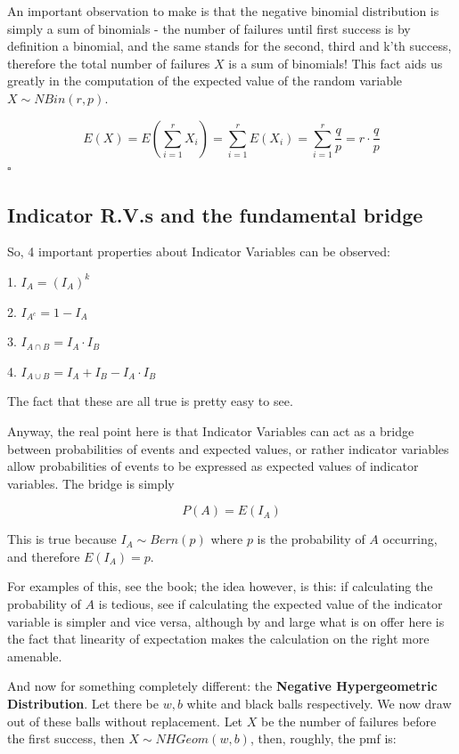 \documentclass{article}
\newcommand{\qed}{\hfill$\square$}
\begin{document}
		An important observation to make is that the negative binomial distribution is simply a sum of binomials - the number of failures until first success is by definition a binomial, and the same stands for the second, third and k'th success, therefore the total number of failures $X$ is a sum of binomials! This fact aids us greatly in the computation of the expected value of the random variable $X \sim NBin(r, p)$.
		
		$$E(X) = E\left( \sum^r_{i=1} X_i \right) = \sum^r_{i=1} E(X_i) = \sum^r_{i=1} \frac{q}{p} = r \cdot \frac{q}{p}$$\qed
		
		
	\subsection{Indicator R.V.s and the fundamental bridge}
	
		So, 4 important properties about Indicator Variables can be observed:
		
		1. $ I_A = (I_A)^k $
		
		2. $ I_{A^c} = 1 - I_A $
		
		3. $ I_{A \cap B} = I_A\cdot I_B $
		
		4. $ I_{A \cup B} = I_A + I_B - I_A\cdot I_B $
		
		The fact that these are all true is pretty easy to see.
		
		Anyway, the real point here is that Indicator Variables can act as a bridge between probabilities of events and expected values, or rather indicator variables allow probabilities of events to be expressed as expected values of indicator variables. The bridge is simply
		
		$$ P(A) = E(I_A) $$
		
		This is true because $I_A \sim Bern(p)$ where $p$ is the probability of $A$ occurring, and therefore $E(I_A) = p$.
		
		For examples of this, see the book; the idea however, is this: if calculating the probability of $A$ is tedious, see if calculating the expected value of the indicator variable is simpler and vice versa, although by and large what is on offer here is the fact that linearity of expectation makes the calculation on the right more amenable.
		
		 And now for something completely different: the \textbf{Negative Hypergeometric Distribution}. Let there be $w, b$ white and black balls respectively. We now draw out of these balls without replacement. Let $X$ be the number of failures before the first success, then $X \sim NHGeom(w, b)$, then, roughly, the pmf is:
		 
\end{document}
